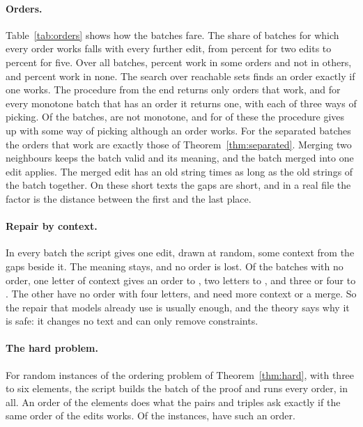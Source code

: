 \documentclass[acmsmall,nonacm,screen]{acmart}
\newcommand{\claim}[2]{#2}
\begin{document}
\paragraph{Orders.} Table~\ref{tab:orders} shows how the batches fare. \claim{orders}{The
share of batches for which every order works falls with every further edit, from
\exEveryTwo{} percent for two edits to \exEveryFive{} percent for five. Over all batches,
\exSome{} percent work in some orders and not in others, and \exNoOrder{} percent work in
none. The search over reachable sets finds an order exactly if one works. The procedure from
the end returns only orders that work, and for every monotone batch that has an order it
returns one, with each of three ways of picking. Of the batches, \exHard{} are not monotone,
and for \exStuck{} of these the procedure gives up with some way of picking although an order
works. For the \exApart{} separated batches the orders that work are exactly those of
Theorem~\ref{thm:separated}. Merging two neighbours keeps the batch valid and its meaning,
and the batch merged into one edit applies.} The merged edit has an old string \exMergeFactor{}
times as long as the old strings of the batch together. On these short texts the gaps are
short, and in a real file the factor is the distance between the first and the last place.

\paragraph{Repair by context.} \claim{context}{In every batch the script gives one edit, drawn at
random, some context from the gaps beside it. The meaning stays, and no order is lost. Of the \exNoOrderCount{} batches with no
order, one letter of context gives an order to \exRepairOne{}, two letters to \exRepairTwo{},
and three or four to \exRepairMore{}. The other \exRepairNone{} have no order with four
letters, and need more context or a merge.} So the repair that models already use is usually
enough, and the theory says why it is safe: it changes no text and can only remove
constraints.

\paragraph{The hard problem.} \claim{hard}{For \exHardInstances{} random instances of the ordering
problem of Theorem~\ref{thm:hard}, with three to six elements, the script builds the batch of
the proof and runs every order, \exHardOrders{} in all. An order of the elements does what the
pairs and triples ask exactly if the same order of the edits works. Of the instances,
\exHardSolvable{} have such an order.}
\end{document}
